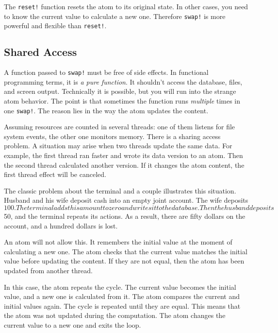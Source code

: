 \fi

The \verb|reset!| function resets the atom to its original state. In other cases, you need to know the current value to calculate a new one.
Therefore \verb|swap!| is more powerful and flexible than \verb|reset!|.

\subsection{Shared Access}


A function passed to \verb|swap!| must be free of side effects. In functional programming terms, it is \emph{a pure function}.
It shouldn't access the database, files, and screen output.
Technically it is possible, but you will run into the strange atom behavior.
The point is that sometimes the function runs \emph{multiple} times in one \verb|swap!|.
The reason lies in the way the atom updates the content.

Assuming resources are counted in several threads: one of them listens for file system events, the other one monitors memory.
There is a sharing access problem.
A situation may arise when two threads update the same data.
For example, the first thread ran faster and wrote its data version to an atom.
Then the second thread calculated another version.
If it changes the atom content, the first thread effect will be canceled.


The classic problem about the terminal and a couple illustrates this situation. Husband and his wife deposit cash into an empty joint account. The wife deposits $ 100. The terminal adds this amount to zero and writes it to the database. Then the husband deposits $ 50, and the terminal repeats its actions. As a result, there are fifty dollars on the account, and a hundred dollars is lost.

An atom will not allow this.
It remembers the initial value at the moment of calculating a new one.
The atom checks that the current value matches the initial value before updating the content.
If they are not equal, then the atom has been updated from another thread.

In this case, the atom repeats the cycle. The current value becomes the initial value, and a new one is calculated from it. The atom compares the current and initial values again. 
The cycle is repeated until they are equal.
This means that the atom was not updated during the computation. 
The atom changes the current value to a new one and exits the loop.

